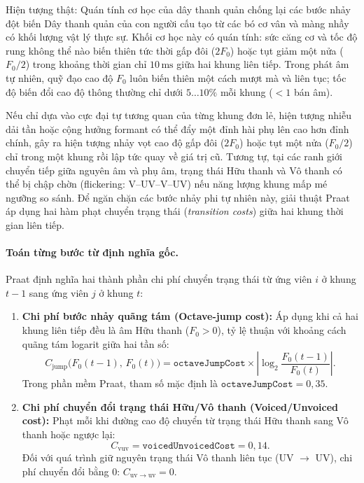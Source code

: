 \begin{firstprin}{Hiện tượng thật: Quán tính cơ học của dây thanh quản chống lại các bước nhảy đột biến}
Dây thanh quản của con người cấu tạo từ các bó cơ vân và màng nhầy có khối lượng vật lý thực sự. Khối cơ học này có quán tính: sức căng cơ và tốc độ rung không thể nào biến thiên tức thời gấp đôi ($2F_0$) hoặc tụt giảm một nửa ($F_0/2$) trong khoảng thời gian chỉ $10\,\text{ms}$ giữa hai khung liên tiếp. Trong phát âm tự nhiên, quỹ đạo cao độ $F_0$ luôn biến thiên một cách mượt mà và liên tục; tốc độ biến đổi cao độ thông thường chỉ dưới $5 \ldots 10\%$ mỗi khung ($< 1$ bán âm).

Nếu chỉ dựa vào cực đại tự tương quan của từng khung đơn lẻ, hiện tượng nhiễu dải tần hoặc cộng hưởng formant có thể đẩy một đỉnh hài phụ lên cao hơn đỉnh chính, gây ra hiện tượng nhảy vọt cao độ gấp đôi ($2F_0$) hoặc tụt một nửa ($F_0/2$) chỉ trong một khung rồi lập tức quay về giá trị cũ. Tương tự, tại các ranh giới chuyển tiếp giữa nguyên âm và phụ âm, trạng thái Hữu thanh và Vô thanh có thể bị chập chờn (flickering: V--UV--V--UV) nếu năng lượng khung mấp mé ngưỡng so sánh. Để ngăn chặn các bước nhảy phi tự nhiên này, giải thuật Praat áp dụng hai hàm phạt chuyển trạng thái (\emph{transition costs}) giữa hai khung thời gian liên tiếp.
\end{firstprin}

\paragraph{Toán từng bước từ định nghĩa gốc.}
Praat định nghĩa hai thành phần chi phí chuyển trạng thái từ ứng viên $i$ ở khung $t-1$ sang ứng viên $j$ ở khung $t$:
\begin{enumerate}[leftmargin=1.4em]
    \item \textbf{Chi phí bước nhảy quãng tám (Octave-jump cost):} Áp dụng khi cả hai khung liên tiếp đều là âm Hữu thanh ($F_0 > 0$), tỷ lệ thuận với khoảng cách quãng tám logarit giữa hai tần số:
    \[
    C_{\mathrm{jump}}\bigl(F_0(t-1),\, F_0(t)\bigr) = \texttt{octaveJumpCost} \times \left| \log_2 \frac{F_0(t-1)}{F_0(t)} \right|.
    \]
    Trong phần mềm Praat, tham số mặc định là $\texttt{octaveJumpCost} = 0{,}35$.
    \item \textbf{Chi phí chuyển đổi trạng thái Hữu/Vô thanh (Voiced/Unvoiced cost):} Phạt mỗi khi đường cao độ chuyển từ trạng thái Hữu thanh sang Vô thanh hoặc ngược lại:
    \[
    C_{\mathrm{vuv}} = \texttt{voicedUnvoicedCost} = 0{,}14.
    \]
    Đối với quá trình giữ nguyên trạng thái Vô thanh liên tục (UV $\to$ UV), chi phí chuyển đổi bằng $0$: $C_{\mathrm{uv}\to\mathrm{uv}} = 0$.
\end{enumerate}

